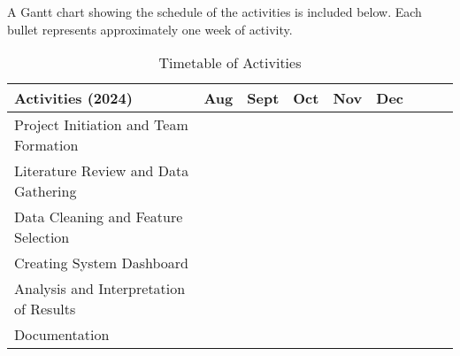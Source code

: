 A Gantt chart showing the schedule of the activities is included below. Each bullet represents approximately one week of activity.

\newcommand{\weekone}{\textbullet}
\newcommand{\weektwo}{\textbullet \textbullet}
\newcommand{\weekthree}{\textbullet \textbullet \textbullet}
\newcommand{\weekfour}{\textbullet \textbullet \textbullet \textbullet}

\begin{table}[ht]
	\centering
	\caption{Timetable of Activities} \vspace{0.25em}
	\begin{tabular}{|p{2in}|c|c|c|c|c|c|c|c|} \hline
		Activities (2024) & Aug & Sept & Oct & Nov & Dec \\ \hline
		Project Initiation and Team Formation & \weektwo & & & & \\ \hline
		Literature Review and Data Gathering & \weektwo & \weekfour & & & \\ \hline
		Data Cleaning and Feature Selection & & \weektwo & & \weekone & \\ \hline
		
		
		Creating System Dashboard & & \weektwo & \weekfour & \weekone & \\ \hline
		Analysis and Interpretation of Results & & & \weekone & & \\ \hline
		Documentation & & \weekone & \weekfour & \weekone & \\ \hline
	\end{tabular}
	\label{tab:timetableactivities}
\end{table}


